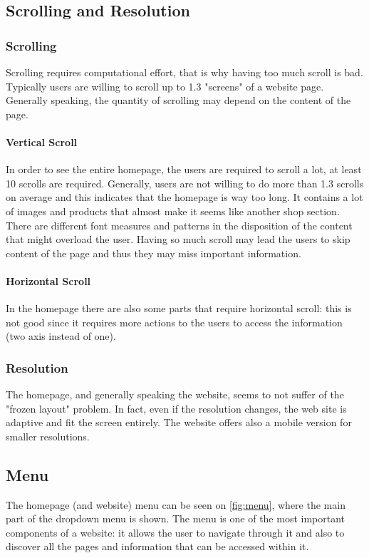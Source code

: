 \subsection{Scrolling and Resolution}
\subsubsection{Scrolling}
Scrolling requires computational effort, that is why having too much scroll is bad. Typically users are willing to scroll up to 1.3 "screens" of a website page. Generally speaking, the quantity of scrolling may depend on the content of the page.\\

\paragraph{Vertical Scroll}
In order to see the entire homepage, the users are required to scroll a lot, at least 10 scrolls are required. 
Generally, users are not willing to do more than 1.3 scrolls on average and this indicates that the homepage is way too long.
It contains a lot of images and products that almost make it seems like another shop section.\\
There are different font measures and patterns in the disposition of the content that might overload the user.
Having so much scroll may lead the users to skip content of the page and thus they may miss important information.

\paragraph{Horizontal Scroll}
In the homepage there are also some parts that require horizontal scroll: this is not good since it requires more actions to the users
to access the information (two axis instead of one).

\subsubsection{Resolution}
The homepage, and generally speaking the website, seems to not suffer of the "frozen layout" problem. 
In fact, even if the resolution changes, the web site is adaptive and fit the screen entirely. 
The website offers also a mobile version for smaller resolutions.


\subsection{Menu}
The homepage (and website) menu can be seen on \cref{fig:menu}, where the main part of the dropdown menu is shown. 
The menu is one of the most important components of a website: it allows the user to navigate through it and 
also to discover all the pages and information that can be accessed within it.

